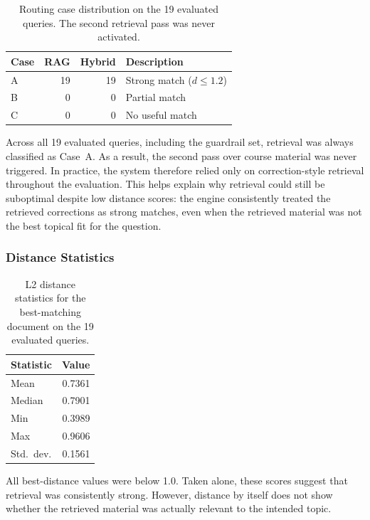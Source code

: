 \begin{table}[H]
\centering
\caption{Routing case distribution on the 19 evaluated queries. The second
retrieval pass was never activated.}
\label{tab:case-distribution}
\begin{tabular}{lrrl}
\toprule
\textbf{Case} & \textbf{RAG} & \textbf{Hybrid} & \textbf{Description} \\
\midrule
A & 19 & 19 & Strong match ($d \leq 1.2$) \\
B &  0 &  0 & Partial match \\
C &  0 &  0 & No useful match \\
\bottomrule
\end{tabular}
\end{table}

Across all 19 evaluated queries, including the guardrail set, retrieval was
always classified as Case~A. As a result, the second pass over course
material was never triggered. In practice, the system therefore relied only
on correction-style retrieval throughout the evaluation. This helps explain
why retrieval could still be suboptimal despite low distance scores: the
engine consistently treated the retrieved corrections as strong matches,
even when the retrieved material was not the best topical fit for the
question.

\subsubsection{Distance Statistics}

\begin{table}[H]
\centering
\caption{L2 distance statistics for the best-matching document on the 19 evaluated queries.}
\label{tab:distance-stats}
\begin{tabular}{lr}
\toprule
\textbf{Statistic} & \textbf{Value} \\
\midrule
Mean     & 0.7361 \\
Median   & 0.7901 \\
Min      & 0.3989 \\
Max      & 0.9606 \\
Std.\ dev.  & 0.1561 \\
\bottomrule
\end{tabular}
\end{table}

All best-distance values were below 1.0. Taken alone, these scores suggest
that retrieval was consistently strong. However, distance by itself does not
show whether the retrieved material was actually relevant to the intended
topic.

